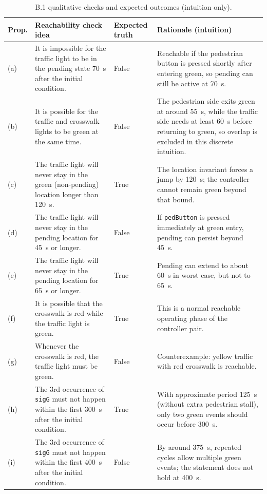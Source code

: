 \documentclass[10pt]{article}
\begin{document}
\begin{table}[H]
\centering
\footnotesize
\setlength{\tabcolsep}{2.5pt}
\begin{tabular}{>{\raggedright\arraybackslash}p{} >{\raggedright\arraybackslash}p{} >{\centering\arraybackslash}p{} >{\raggedright\arraybackslash}p{}}
\toprule
Prop. & Reachability check idea & Expected truth & Rationale (intuition) \\
\midrule
(a) & It is impossible for the traffic light to be in the pending state \SI{70}{s} after the initial condition. & False & Reachable if the pedestrian button is pressed shortly after entering green, so pending can still be active at \SI{70}{s}. \\
(b) & It is possible for the traffic and crosswalk lights to be green at the same time. & False & The pedestrian side exits green at around \SI{55}{s}, while the traffic side needs at least \SI{60}{s} before returning to green, so overlap is excluded in this discrete intuition. \\
(c) & The traffic light will never stay in the green (non-pending) location longer than \SI{120}{s}. & True & The location invariant forces a jump by \SI{120}{s}; the controller cannot remain green beyond that bound. \\
(d) & The traffic light will never stay in the pending location for \SI{45}{s} or longer. & False & If \texttt{pedButton} is pressed immediately at green entry, pending can persist beyond \SI{45}{s}. \\
(e) & The traffic light will never stay in the pending location for \SI{65}{s} or longer. & True & Pending can extend to about \SI{60}{s} in worst case, but not to \SI{65}{s}. \\
(f) & It is possible that the crosswalk is red while the traffic light is green. & True & This is a normal reachable operating phase of the controller pair. \\
(g) & Whenever the crosswalk is red, the traffic light must be green. & False & Counterexample: yellow traffic with red crosswalk is reachable. \\
(h) & The 3rd occurrence of \texttt{sigG} must not happen within the first \SI{300}{s} after the initial condition. & True & With approximate period \SI{125}{s} (without extra pedestrian stall), only two green events should occur before \SI{300}{s}. \\
(i) & The 3rd occurrence of \texttt{sigG} must not happen within the first \SI{400}{s} after the initial condition. & False & By around \SI{375}{s}, repeated cycles allow multiple green events; the statement does not hold at \SI{400}{s}. \\
\bottomrule
\end{tabular}
\caption{B.1 qualitative checks and expected outcomes (intuition only).}
\label{tab:b1_discrete}
\end{table}
\end{document}
